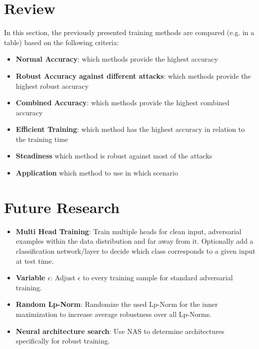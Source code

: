 \documentclass[conference]{IEEEtran}
\begin{document}
\section{Review}
In this section, the previously presented training methods are compared (e.g. in a table) based on the following criteria:
\begin{itemize}
  \item \textbf{Normal Accuracy}: which methods provide the highest accuracy
  \item \textbf{Robust Accuracy against different attacks}: which methods provide the highest robust accuracy
  \item \textbf{Combined Accuracy}: which methods provide the highest combined accuracy
  \item \textbf{Efficient Training}: which method has the highest accuracy in relation to the training time
  \item \textbf{Steadiness} which method is robust against most of the attacks
  \item \textbf{Application} which method to use in which scenario \\
\end{itemize}


\section{Future Research}
\begin{itemize}
  \item \textbf{Multi Head Training}: Train multiple heads for clean input, adversarial examples within the data distribution and far away from it. Optionally add a classification network/layer to decide which class corresponds to a given input at test time. \cite{b24}
  \item \textbf{Variable $\epsilon$}: Adjust $\epsilon$ to every training sample for standard adversarial training. \cite{b1}
  \item \textbf{Random Lp-Norm}: Randomize the used Lp-Norm for the inner maximization to increase average robustness over all Lp-Norms. 
  \item \textbf{Neural architecture search}: Use NAS to determine architectures specifically for robust training. \\
\end{itemize}

\end{document}
